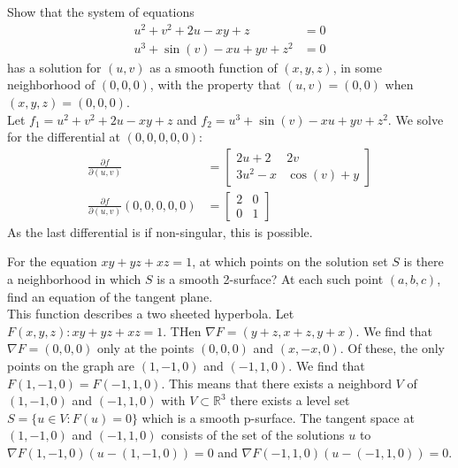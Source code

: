 \documentclass[12pt]{book}
\newcommand{\R}{\mathbb{R}}
\newenvironment{exercise}[2][Exercise]{\begin{trivlist}
\item[\hskip \labelsep {\bfseries #1}\hskip \labelsep {\bfseries #2.}]}{\end{trivlist}}
\begin{document}
\begin{exercise}{9.7.4}
    Show that the system of equations 
    \begin{align*}
        u^2 + v^2 + 2 u - x y + z &= 0 \\
        u^3 + \sin(v) - x u + yv + z^2 &= 0
    \end{align*}
    has a solution for $(u,v)$ as a smooth function of $(x,y,z)$, in some neighborhood of $(0,0,0)$, with the property that $(u,v) = (0,0)$ when $(x,y,z) = (0,0,0)$.  \\
    
    Let $f_1 = u^2 + v^2 + 2 u - x y + z $ and $f_2 = u^3 + \sin(v) - x u + yv + z^2 $. We solve for the differential at $(0,0,0,0,0)$:
    \begin{align*}
        \frac{\partial f}{\partial (u,v)} &= \begin{bmatrix} 2 u + 2 & 2v \\ 3u^2-x & \cos(v)+y \end{bmatrix} \\
        \frac{\partial f}{\partial (u,v)} (0,0,0,0,0) &= \begin{bmatrix} 2 & 0 \\ 0 & 1 \end{bmatrix} 
    \end{align*}
    As the last differential is if non-singular, this is possible.
\end{exercise}


\begin{exercise}{9.7.6}
    For the equation $xy + yz + xz = 1$, at which points on the solution set $S$ is there a neighborhood in which $S$ is a smooth 2-surface? At each such point $(a,b,c)$, find an equation of the tangent plane.  \\
    
    This function describes a two sheeted hyperbola. Let $F(x,y,z):  xy + yz + xz =1$.  THen $\nabla F = (y+z, x+z, y+x)$. We find that $\nabla F = (0,0,0)$ only at the points $(0,0,0)$ and $(x,-x,0)$. Of these, the only points on the graph are $(1,-1,0)$ and $(-1,1,0)$. We find that $F(1,-1,0)=F(-1,1,0)$. This means that there exists a neighbord $V$ of $(1,-1,0)$ and $(-1,1,0)$ with $V \subset \R^3$ there exists a level set $S = \{u \in V : F(u)=0\}$ which is a smooth p-surface. The tangent space at $(1,-1,0)$ and $(-1,1,0)$ consists of the set of the solutions $u$ to $\nabla F(1,-1,0) (u - (1,-1,0))=0$ and $\nabla F(-1,1,0) (u - (-1,1,0))=0$.
\end{exercise}
\end{document}
